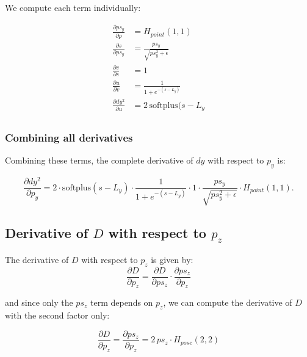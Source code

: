 \documentclass[11pt]{article}
\begin{document}
            We compute each term individually:
            
            \begin{align}
                \frac{\partial ps_{y}}{\partial p} &= H_{point}(1,1) \\
                \frac{\partial s}{\partial ps_{y}} &= \frac{ps_{y}}{\sqrt{ps_{y}^2 + \epsilon}}\\
                \frac{\partial v}{\partial s} &= 1\\
                \frac{\partial u}{\partial v} &= \frac{1}{1 + e^{-(s - L_y)}}\\
                \frac{\partial dy^2}{\partial u} &= 2\,\text{softplus}(s - L_{y}\\
            \end{align}
            
            
            \subsubsection*{Combining all derivatives}
            
            Combining these terms, the complete derivative of \(dy\) with respect to \(p_y\) is:
            
            \begin{equation}
                \frac{\partial dy^2}{\partial p_y} = 2 \cdot
                \text{softplus}(s - L_y)
                \cdot \frac{1}{1 + e^{-(s - L_y)}}
                \cdot 1
                \cdot \frac{ps_{y}}{\sqrt{ps_{y}^2 + \epsilon}}
                \cdot H_{point}(1,1).
            \end{equation}

        \subsection*{Derivative of $D$ with respect to $p_z$}

            The derivative of \(D\) with respect to \(p_z\) is given by:
            \begin{equation}
                \frac{\partial D}{\partial p_z} = \frac{\partial D}{\partial ps_{z}} \cdot \frac{\partial ps_{z}}{\partial p_z}
            \end{equation}

            and since only the \(ps_{z}\) term depends on \(p_z\), we can compute the derivative of \(D\) with the second factor only:

            \begin{equation}
                \frac{\partial D}{\partial p_z} = \frac{\partial ps_{z}}{\partial p_z} =  2\,ps_{z} \cdot H_{pose}(2,2)
            \end{equation}
\end{document}
